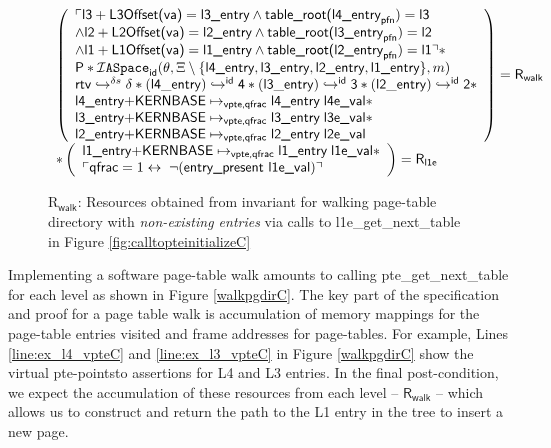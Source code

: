 \begin{figure}\footnotesize
$\begin{array}{l}\left( \begin{array}{l} \ulcorner \textsf{l3}+\textsf{L3Offset(va)} = \textsf{l3\_entry} \land \textsf{table\_root(l4\_entry}_{\textsf{pfn}})  = \textsf{l3} \\ \land \textsf{l2}+\textsf{L2Offset(va)} = \textsf{l2\_entry} \land \textsf{table\_root(l3\_entry}_{\textsf{pfn}})  = \textsf{l2} \\ \land \textsf{l1}+\textsf{L1Offset(va)} = \textsf{l1\_entry} \land \textsf{table\_root(l2\_entry}_{\textsf{pfn}})  = \textsf{l1} \urcorner  \ast \\  \textsf{P} \ast \mathcal{I}\texttt{ASpace}_{\textsf{id}}(\theta,\Xi\setminus\{\textsf{l4\_entry},\textsf{l3\_entry},\textsf{l2\_entry},\textsf{l1\_entry}\},m)  \\ \ghostmaptoken{\delta{}s}{\rtv}{\delta} \ast  
      \ghostmaptoken{\textsf{id}}{(\mathsf{l4\_entry})}{\textsf{4}}\ast \ghostmaptoken{\textsf{id}}{(\mathsf{l3\_entry})}{\textsf{3}} \ast \ghostmaptoken{\textsf{id}}{(\mathsf{l2\_entry})}{\textsf{2}}  \ast \\  \textsf{l4\_entry+KERNBASE} \mapsto_{\textsf{vpte,qfrac}} \textsf{l4\_entry} \; \textsf{l4e\_val}  \ast \\  \textsf{l3\_entry+KERNBASE} \mapsto_{\textsf{vpte,qfrac}} \textsf{l3\_entry}\;\textsf{l3e\_val}  \ast \\  \textsf{l2\_entry+KERNBASE} \mapsto_{\textsf{vpte,qfrac}} \textsf{l2\_entry} \; \textsf{l2e\_val}  \end{array} \right)  =\textsf{R}_{\textsf{walk} } 
    \\ \ast \left(\begin{array}{l}  \textsf{l1\_entry+KERNBASE} \mapsto_{\textsf{vpte,qfrac}} \textsf{l1\_entry}\;\textsf{l1e\_val} \ast \\ \ulcorner  \textsf{qfrac} = 1 \leftrightarrow \; \lnot(\textsf{entry\_present l1e\_val})\urcorner \end{array}\right) =\textsf{R}_{\textsf{l1e}}\end{array} $
\caption{\textsf{R}$_{\textsf{walk}}$: Resources obtained from invariant for walking page-table directory with \emph{non-existing entries} via calls to \textsf{l1e\_get\_next\_table} in Figure \ref{fig:calltopteinitializeC}}
\label{fig:rwalkC}
\vspace{-1em}
\end{figure}
Implementing a software page-table walk amounts to calling \textsf{pte\_get\_next\_table} for each level as shown in Figure \ref{walkpgdirC}. 
The key part of the specification and proof for a page table walk is accumulation of memory mappings for the page-table entries 
visited and frame addresses for page-tables. 
For example, Lines \ref{line:ex_l4_vpteC} and \ref{line:ex_l3_vpteC} in Figure \ref{walkpgdirC} show the virtual pte-pointsto assertions for L4 and L3 entries.
In the final post-condition, we expect the accumulation of these resources from each level -- $\textsf{R}_{\textsf{walk}}$ -- 
which allows us to construct and return the path to the L1 entry in the tree to insert a new page.  

